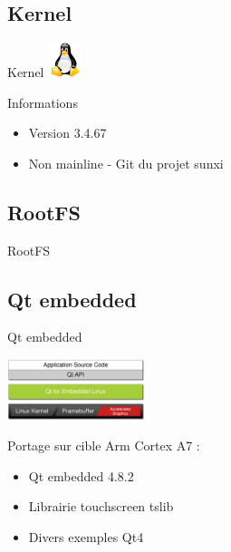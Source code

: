 \documentclass[11pt]{beamer}
\begin{document}
	\subsection{Kernel}
	\begin{frame}{Kernel}
	\includegraphics[width=1cm]{commons/tux.png}
		\begin{block}{Informations}
		\begin{itemize}
			\item Version 3.4.67
			\item Non mainline - Git du projet sunxi
			\href{https://github.com/linux-sunxi/linux-sunxi}{}
		\end{itemize}
	\end{block}
	\end{frame}
	
	\subsection{RootFS}
	\begin{frame}{RootFS}
		\begin{center}
			
		\end{center}
	\end{frame}
	
	\subsection{Qt embedded}
	\begin{frame}{Qt embedded}
		\begin{center}
			  \includegraphics[width=4cm]{commons/qt-embedded-linux-architecture.png}
		\end{center}
			  Portage sur cible Arm Cortex A7 : 
		\begin{itemize}
			  \item<+-|alert@+> Qt embedded 4.8.2
			  \item<+-|alert@+> Librairie touchscreen tslib
			  \item<+-|alert@+> Divers exemples Qt4
		\end{itemize}
	\end{frame}
	
\end{document}
